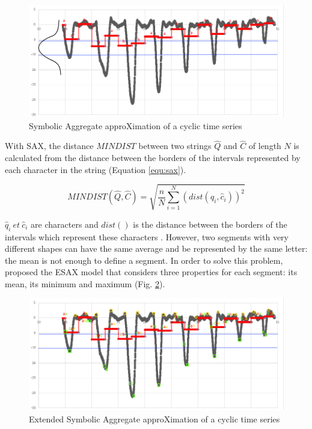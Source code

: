  \begin{figure}[h]
  \centering
   \includegraphics[scale=0.6]{images/sax-p/sax2}
    \caption{Symbolic Aggregate approXimation of a cyclic time series}
  \label{fig:sax}
  \end{figure}
	

With SAX, the distance $MINDIST$ between two strings $\hat{Q}$ and $\hat{C}$ of length $N$ is calculated from the
distance between the borders of the intervals represented by each character in the string 
(Equation \ref{equ:sax}).


\begin{equation}
MINDIST(\hat{Q},\hat{C})=\sqrt{\frac{n}{N}\sum_{i=1}^{N}(dist(\hat{q}_{i},\hat{c}_{i}))^{2}}
\label{equ:sax}
\end{equation}


$\hat{q}_{i}\:et\:\hat{c}_{i}$ are characters and $ dist() $ is the distance between the borders of 
the intervals which represent these characters  \cite{lin2003symbolic}. However, two segments with very 
different shapes can have the same average and be represented by the same letter: the mean is not 
enough to define a segment. In order to solve this problem, \cite{Lkhagva2006} proposed the ESAX 
model that considers three properties for each segment: its mean, its minimum and maximum (Fig. \ref{fig:esax}).

 \begin{figure}[h]
  \centering
   \includegraphics[scale=0.6]{images/sax-p/Esax}
    \caption{Extended Symbolic Aggregate approXimation of a cyclic time series}
  \label{fig:esax}
  \end{figure}

